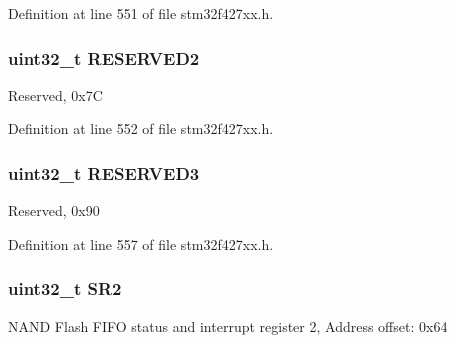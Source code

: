 Definition at line 551 of file stm32f427xx.\+h.

\subsubsection[{\texorpdfstring{R\+E\+S\+E\+R\+V\+E\+D2}{RESERVED2}}]{\setlength{\rightskip}{0pt plus 5cm}uint32\+\_\+t R\+E\+S\+E\+R\+V\+E\+D2}\hypertarget{struct_f_m_c___bank2__3___type_def_a4c9b972a304c0e08ca27cbe57627c496}{}\label{struct_f_m_c___bank2__3___type_def_a4c9b972a304c0e08ca27cbe57627c496}
Reserved, 0x7C 

Definition at line 552 of file stm32f427xx.\+h.

\subsubsection[{\texorpdfstring{R\+E\+S\+E\+R\+V\+E\+D3}{RESERVED3}}]{\setlength{\rightskip}{0pt plus 5cm}uint32\+\_\+t R\+E\+S\+E\+R\+V\+E\+D3}\hypertarget{struct_f_m_c___bank2__3___type_def_af2b40c5e36a5e861490988275499e158}{}\label{struct_f_m_c___bank2__3___type_def_af2b40c5e36a5e861490988275499e158}
Reserved, 0x90 

Definition at line 557 of file stm32f427xx.\+h.

\subsubsection[{\texorpdfstring{S\+R2}{SR2}}]{ uint32\+\_\+t S\+R2}\hypertarget{struct_f_m_c___bank2__3___type_def_a89623ee198737b29dc0a803310605a83}{}\label{struct_f_m_c___bank2__3___type_def_a89623ee198737b29dc0a803310605a83}
N\+A\+ND Flash F\+I\+FO status and interrupt register 2, Address offset\+: 0x64 

